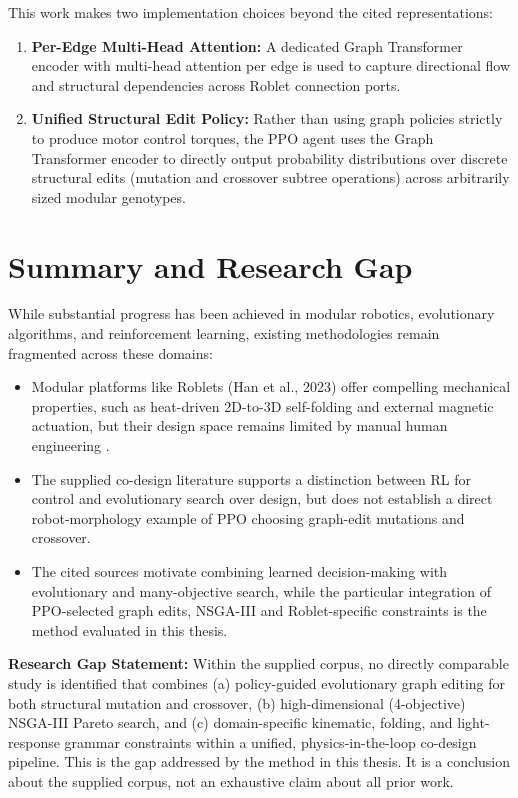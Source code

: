 \documentclass[12pt,a4paper]{report}
\begin{document}
This work makes two implementation choices beyond the cited representations:
\begin{enumerate}
    \item \textbf{Per-Edge Multi-Head Attention:} A dedicated Graph Transformer encoder with multi-head attention per edge is used to capture directional flow and structural dependencies across Roblet connection ports.
    \item \textbf{Unified Structural Edit Policy:} Rather than using graph policies strictly to produce motor control torques, the PPO agent uses the Graph Transformer encoder to directly output probability distributions over discrete structural edits (mutation and crossover subtree operations) across arbitrarily sized modular genotypes.
\end{enumerate}

\section{Summary and Research Gap}
While substantial progress has been achieved in modular robotics, evolutionary algorithms, and reinforcement learning, existing methodologies remain fragmented across these domains:
\begin{itemize}
    \item Modular platforms like Roblets (Han et al., 2023) offer compelling mechanical properties, such as heat-driven 2D-to-3D self-folding and external magnetic actuation, but their design space remains limited by manual human engineering \citep{han2023roblets}.
    \item The supplied co-design literature supports a distinction between RL for control and evolutionary search over design, but does not establish a direct robot-morphology example of PPO choosing graph-edit mutations and crossover.
    \item The cited sources motivate combining learned decision-making with evolutionary and many-objective search, while the particular integration of PPO-selected graph edits, NSGA-III and Roblet-specific constraints is the method evaluated in this thesis.
\end{itemize}

\textbf{Research Gap Statement:}
Within the supplied corpus, no directly comparable study is identified that combines (a) policy-guided evolutionary graph editing for both structural mutation and crossover, (b) high-dimensional (4-objective) NSGA-III Pareto search, and (c) domain-specific kinematic, folding, and light-response grammar constraints within a unified, physics-in-the-loop co-design pipeline. This is the gap addressed by the method in this thesis. It is a conclusion about the supplied corpus, not an exhaustive claim about all prior work.
\end{document}
